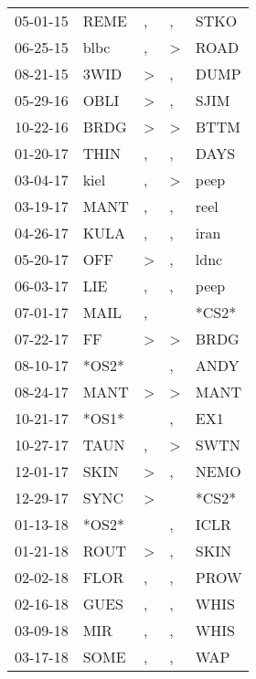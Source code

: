 \begin{supertabular}{lllll}
 05-01-15 &   REME &             , &             , &   STKO \\
 06-25-15 &   blbc &             , &  \textgreater &   ROAD \\
 08-21-15 &   3WID &  \textgreater &             , &   DUMP \\
 05-29-16 &   OBLI &  \textgreater &             , &   SJIM \\
 10-22-16 &   BRDG &  \textgreater &  \textgreater &   BTTM \\
 01-20-17 &   THIN &             , &             , &   DAYS \\
 03-04-17 &   kiel &             , &  \textgreater &   peep \\
 03-19-17 &   MANT &             , &             , &   reel \\
 04-26-17 &   KULA &             , &             , &   iran \\
 05-20-17 &    OFF &  \textgreater &             , &   ldnc \\
 06-03-17 &    LIE &             , &             , &   peep \\
 07-01-17 &   MAIL &             , &               &  *CS2* \\
 07-22-17 &     FF &  \textgreater &  \textgreater &   BRDG \\
 08-10-17 &  *OS2* &               &             , &   ANDY \\
 08-24-17 &   MANT &  \textgreater &  \textgreater &   MANT \\
 10-21-17 &  *OS1* &               &             , &    EX1 \\
 10-27-17 &   TAUN &             , &  \textgreater &   SWTN \\
 12-01-17 &   SKIN &  \textgreater &             , &   NEMO \\
 12-29-17 &   SYNC &  \textgreater &               &  *CS2* \\
 01-13-18 &  *OS2* &               &             , &   ICLR \\
 01-21-18 &   ROUT &  \textgreater &             , &   SKIN \\
 02-02-18 &   FLOR &             , &             , &   PROW \\
 02-16-18 &   GUES &             , &             , &   WHIS \\
 03-09-18 &    MIR &             , &             , &   WHIS \\
 03-17-18 &   SOME &             , &             , &    WAP \\

\end{supertabular}
